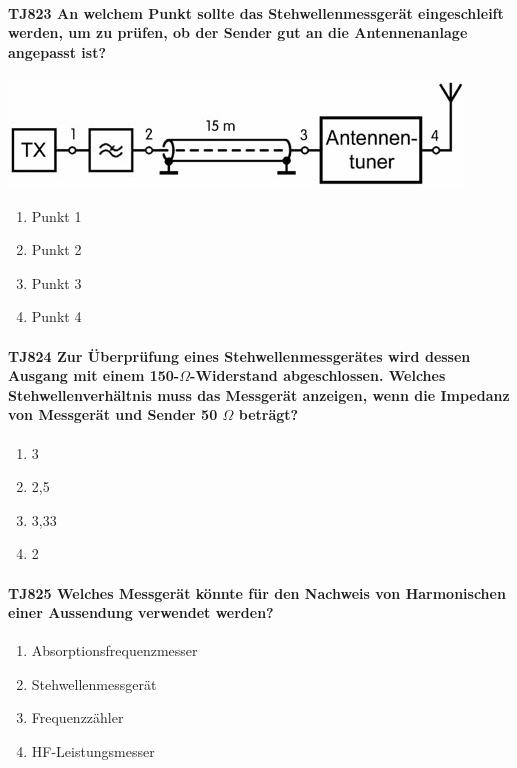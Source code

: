\documentclass[8pt]{article}
\begin{document}
\paragraph*{TJ823 An welchem Punkt sollte das Stehwellenmessgerät eingeschleift werden, um zu prüfen, ob der Sender gut an die Antennenanlage angepasst ist?}
\begin{center}
	\begin{minipage}{\linewidth}
		\centering
		\includegraphics[scale=1.0]{pics/tj823_a.jpg}
	\end{minipage}
\end{center}
\begin{enumerate}[nolistsep,label=\Alph*]
\item Punkt 1
\item Punkt 2
\item Punkt 3
\item Punkt 4
\end{enumerate}

\paragraph*{TJ824 Zur Überprüfung eines Stehwellenmessgerätes wird dessen Ausgang mit einem 150-$\Omega$-Widerstand abgeschlossen. Welches Stehwellenverhältnis muss das Messgerät anzeigen, wenn die Impedanz von Messgerät und Sender 50 $\Omega$ beträgt?}
\begin{enumerate}[nolistsep,label=\Alph*]
\item 3
\item 2,5
\item 3,33
\item 2
\end{enumerate}

\paragraph*{TJ825 Welches Messgerät könnte für den Nachweis von Harmonischen einer Aussendung verwendet werden?}
\begin{enumerate}[nolistsep,label=\Alph*]
\item Absorptionsfrequenzmesser
\item Stehwellenmessgerät
\item Frequenzzähler
\item HF-Leistungsmesser
\end{enumerate}
\end{document}
